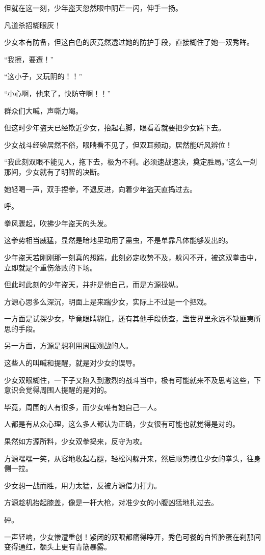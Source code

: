 \begin{this_body}
但就在这一刻，少年盗天忽然眼中阴芒一闪，伸手一扬。

凡道杀招糊眼灰！

少女本有防备，但这白色的灰竟然透过她的防护手段，直接糊住了她一双秀眸。

“我擦，要遭！”

“这小子，又玩阴的！！”

“小心啊，他来了，快防守啊！！”

群众们大喊，声嘶力竭。

但这时少年盗天已经欺近少女，抬起右脚，眼看着就要把少女踹下去。

少女战斗经验居然不俗，眼睛看不见了，但双耳频动，居然能听风辨位！

“我此刻双眼不能见人，拖下去，极为不利。必须速战速决，奠定胜局。”这么一刹那间，少女就有了明智的决断。

她轻喝一声，双手捏拳，不退反进，向着少年盗天直捣过去。

呼。

拳风骤起，吹拂少年盗天的头发。

这拳势相当威猛，显然是暗地里动用了蛊虫，不是单靠凡体能够发出的。

少年盗天若刚刚那一刻真的想踹，此刻必定收势不及，躲闪不开，被这双拳击中，立即就是个重伤落败的下场。

但此时此刻的少年盗天，并非是他自己，而是方源操纵。

方源心思多么深沉，明面上是来踹少女，实际上不过是一个把戏。

一方面是试探少女，毕竟眼睛糊住，还有其他手段侦查，蛊世界里永远不缺匪夷所思的手段。

另一方面，方源是想利用周围观战的人。

这些人的叫喊和提醒，就是对少女的误导。

少女双眼糊住，一下子又陷入到激烈的战斗当中，极有可能就来不及思考这些，下意识会觉得周围人提醒的是对的。

毕竟，周围的人有很多，而少女唯有她自己一人。

人都是有从众心理，这么多人都认为正确，少女很有可能也就觉得是对的。

果然如方源所料，少女双拳捣来，反守为攻。

方源嘿嘿一笑，从容地收起右腿，轻松闪躲开来，然后顺势拽住少女的拳头，往身侧一拉。

少女想一战而胜，用力太猛，反被方源借力打力。

方源趁机抬起膝盖，像是一杆大枪，对准少女的小腹凶猛地扎过去。

砰。

一声轻响，少女惨遭重创！紧闭的双眼都痛得睁开，秀色可餐的白皙脸蛋在刹那间变得通红，额头上更有青筋暴露。


\end{this_body}
